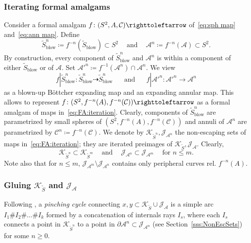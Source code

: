 \documentclass{amsart}
\theoremstyle{plain}
\theoremstyle{definition}
\theoremstyle{remark}
\renewcommand{\AA}{{\mathcal A}}
\newcommand{\blowup}{{\operatorname{blow}}}
\newcommand{\filled}{{\mathcal K}}
\newcommand{\reminder}[1]{\textsl{$\lhd\rhd$#1$\lhd\rhd$}\marginpar{$\lhd\rhd\lhd\rhd\lhd\rhd$}}%
\newcommand{\hide}[1]{}
\renewcommand{\sp}{{\ \ }}
\newcommand{\Jul}{{\mathcal J}}
\newcommand{\CC}{{\mathcal C}}
\newcommand\selfmap{\righttoleftarrow}
\begin{document}
\subsubsection{Iterating formal amalgams} \label{sss:FA:n}Consider a formal amalgam $f\colon (S^2,A,\CC)\selfmap$ of~\eqref{eq:sph map} and~\eqref{eq:ann map}. Define 
\begin{equation} \widetilde S^n_\blowup \coloneq f^{-n}(\widetilde S_\blowup)\subset S^2 \sp\sp\text{ and }\sp\sp \AA^n \coloneq f^{-n}(\AA)\subset S^2.
\end{equation}
By construction, every component of $\widetilde S^n_\blowup $ and $\AA^n$ is within a component of either $\widetilde S_\blowup$ or of $ \AA$. 
Set $\AA'^n\coloneq f^{-1}(\AA^n)\cap \AA^n$. We view
\begin{equation}
\label{eq:FA:iteration} f|\widetilde S^n_\blowup\colon  \widetilde S^n_\blowup\dashrightarrow  \widetilde S^n_\blowup\sp\sp\sp\text{ and }\sp\sp\sp f| \AA'^n \colon \AA'^n\to \AA^n
\end{equation}
as a blown-up B\"ottcher expanding map and an expanding annular map. This allows to represent $f\colon (S^2,f^{-n} (A),f^{-n}(\CC))\selfmap$ as a formal amalgam of maps in~\eqref{eq:FA:iteration}. Clearly, components of $\widetilde S^n_\blowup$ are parametrized by small spheres of $(S^2,f^{-n} (A),f^{-n}(\CC))$ and annuli of $\AA^n$ are parametrized by $\CC^n\coloneq f^{-n}(\CC)$. We denote by $\filled_{\widetilde S^n}, \Jul_{\AA^n}$ the non-escaping sets of maps in~\eqref{eq:FA:iteration}; they are iterated preimages of $\filled_{\widetilde S}, \Jul_{\AA}$. Clearly,
\[ \filled_{\widetilde S^n}\subset \filled_{\widetilde S^m}\sp\sp\text{ and }\sp\sp\Jul_{\AA^n}\subset \Jul_{\AA^m} \sp\sp\text{ for }n\le m.\]
Note also that for $n\leq m$, $\Jul_{\AA^m} \setminus \Jul_{\AA^n}$ contains only peripheral curves rel. $f^{-n}(A)$.





\subsubsection{Gluing $\filled_{\widetilde S}$ and $\Jul_{\AA}$}
Following \cite[Definition 6.4]{BD_Exp}, a \emph{pinching cycle} connecting $x,y\subset \filled_{\widetilde S}\cup \Jul_\AA$ is a simple arc  $I_1\# I_2\#\dots  \#I_k$ formed by a concatenation of internals rays $I_s$, where each $I_s$ connects a point in $\filled_{\widetilde S^n}$ to a point in $\partial \AA^n\subset \Jul_{\AA^n}$ (see Section~\ref{sss:NonEscSets}) for some $n\ge 0$.
\end{document}
